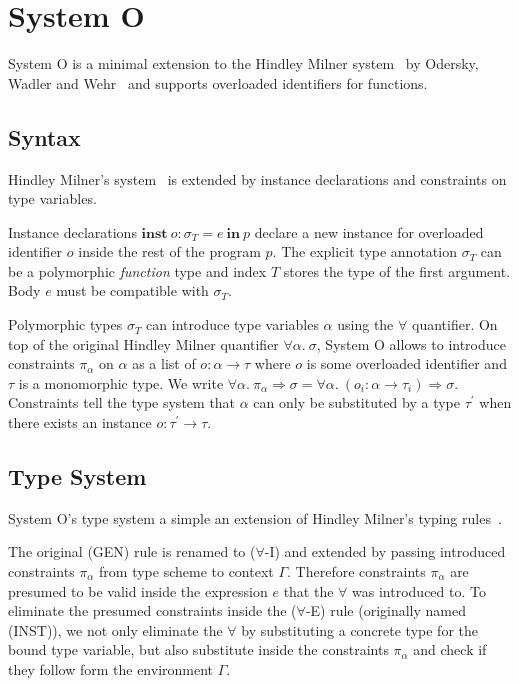 \documentclass[runningheads]{llncs}
\begin{document}
\section{System O}
System O is a minimal extension to the Hindley Milner system~\cite{hm78} by Odersky, Wadler and Wehr~\cite{oww95} and supports overloaded identifiers for functions.
\subsection{Syntax}
Hindley Milner's system~\cite{hm78} is extended by instance declarations and constraints on type variables.

Instance declarations $\textbf{inst} \ o : \sigma_T = e \ \textbf{in} \ p$ declare a new instance for overloaded identifier $o$ inside the rest of the program $p$. The explicit type annotation $\sigma_T$ can be a polymorphic \emph{function} type and index $T$ stores the type of the first argument. Body $e$ must be compatible with $\sigma_T$.

Polymorphic types $\sigma_T$ can introduce type variables $\alpha$ using the $\forall$ quantifier. On top of the original Hindley Milner quantifier $\forall \alpha. \ \sigma$, System O allows to introduce constraints $\pi_\alpha$ on $\alpha$ as a list of $o : \alpha \rightarrow \tau$ where $o$ is some overloaded identifier and $\tau$ is a monomorphic type. We write   $\forall \alpha. \ \pi_\alpha \Rightarrow \sigma = \forall \alpha. \ (o_i : \alpha \rightarrow \tau_i) \Rightarrow \sigma$. Constraints tell the type system that $\alpha$ can only be substituted by a type $\tau^\prime$ when there exists an instance $o : \tau^\prime \rightarrow \tau$.
\subsection{Type System}
System O's type system a simple an extension of Hindley Milner's typing rules~\cite{dm82}. 

The original (GEN) rule is renamed to ($\forall$-I) and extended by passing introduced constraints $\pi_\alpha$ from type scheme to context $\Gamma$. Therefore constraints $\pi_\alpha$ are presumed to be valid inside the expression $e$ that the $\forall$ was introduced to. To eliminate the presumed constraints inside the ($\forall$-E) rule (originally named (INST)), we not only eliminate the $\forall$ by substituting a concrete type for the bound type variable, but also substitute inside the constraints $\pi_\alpha$ and check if they follow form the environment $\Gamma$. 
\end{document}
